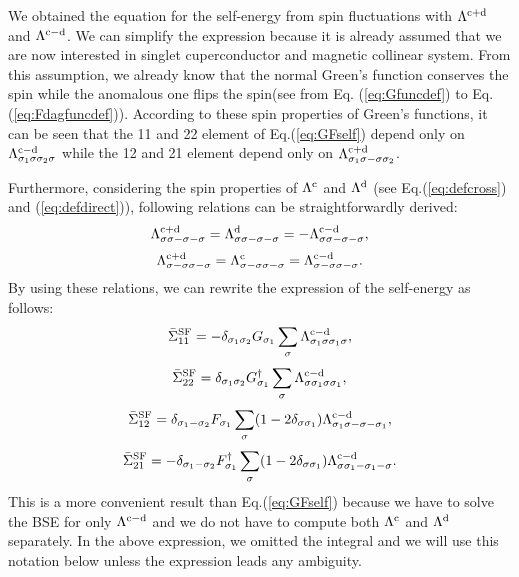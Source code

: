 We obtained the equation for the self-energy from spin fluctuations with $\Lambda^{\rm c + \rm d}$ and $\Lambda^{\rm c - \rm d}$.
We can simplify the expression because it is already assumed that we are now interested in singlet cuperconductor and magnetic collinear system.
From this assumption, we already know that the normal Green's function 
conserves the spin while the anomalous one flips the spin(see from Eq.
(\ref{eq:Gfuncdef}) to Eq.(\ref{eq:Fdagfuncdef})).
According to these spin properties of Green's functions, it can be seen that
the 11 and 22 element of Eq.(\ref{eq:GFself}) depend only on $\Lambda^{\rm c - \rm d}_{\sigma_1\sigma\sigma_2\sigma}$ 
while the 12 and 21 element depend only on $\Lambda^{\rm c + \rm d}_{\sigma_1\sigma-\sigma\sigma_2}$.

Furthermore, considering the spin properties of $\Lambda^{\rm c}$ and 
$\Lambda^{\rm d}$ (see Eq.(\ref{eq:defcross}) and (\ref{eq:defdirect})),
following relations can be straightforwardly derived:
%
\begin{equation}
	\Lambda^{\rm c + \rm d}_{\sigma\sigma-\sigma-\sigma} =
	\Lambda^{\rm d}_{\sigma\sigma-\sigma-\sigma} =
	- \Lambda^{\rm c - \rm d}_{\sigma\sigma-\sigma-\sigma},
	\label{eq:lambdasimp1}
\end{equation}
%
\begin{equation}
	\Lambda^{\rm c + \rm d}_{\sigma-\sigma\sigma-\sigma} =
	\Lambda^{\rm c}_{\sigma-\sigma\sigma-\sigma} =
	\Lambda^{\rm c - \rm d}_{\sigma-\sigma\sigma-\sigma}.
	\label{eq:lambdasimp2}
\end{equation}
%
By using these relations, we can rewrite the expression of the self-energy as follows:
%
\begin{equation}
	\bar{\Sigma}^{\rm{SF}}_{11} = -\delta_{\sigma_1\sigma_2}G_{\sigma_1}
	\sum_{\sigma}\Lambda^{\rm c - \rm d}_{\sigma_1\sigma\sigma_1\sigma},
	\label{eq:Sigma11}
\end{equation}
%
\begin{equation}
	\bar{\Sigma}^{\rm{SF}}_{22} = \delta_{\sigma_1\sigma_2}G^{\dag}_{\sigma_1}
	\sum_{\sigma}\Lambda^{\rm c - \rm d}_{\sigma\sigma_1\sigma\sigma_1},
	\label{eq:Sigma22}
\end{equation}
%
\begin{equation}
	\bar{\Sigma}^{\rm{SF}}_{12} = \delta_{\sigma_1-\sigma_2}F_{\sigma_1}
	\sum_{\sigma}(1-2\delta_{\sigma\sigma_1})\Lambda^{\rm c - \rm d}_{\sigma_1\sigma-\sigma-\sigma_1},
	\label{eq:Sigma12}
\end{equation}
%
\begin{equation}
	\bar{\Sigma}^{\rm{SF}}_{21} = -\delta_{\sigma_1-\sigma_2}F^{\dag}_{\sigma_1}
	\sum_{\sigma}(1-2\delta_{\sigma\sigma_1})\Lambda^{\rm c - \rm d}_{\sigma\sigma_1-\sigma_1-\sigma}.
	\label{eq:Sigma21}
\end{equation}
%
This is a more convenient result than Eq.({\ref{eq:GFself}}) because 
we have to solve the BSE for only $\Lambda^{\rm c - \rm d}$ and 
we do not have to compute both $\Lambda^{\rm c}$ and $\Lambda^{\rm d}$ separately.
In the above expression, we omitted the integral and we will use this 
notation below unless the expression leads any ambiguity. 

